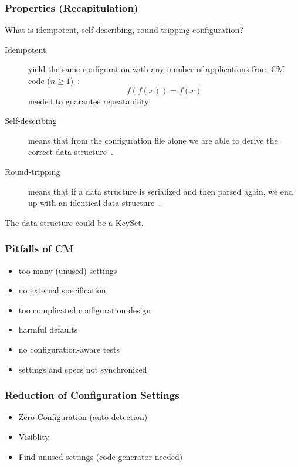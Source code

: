 

\begin{frame}
	\frametitle{Properties (Recapitulation)}

	\begin{task}
	What is idempotent, self-describing, round-tripping configuration?
	\end{task}

	\pause


	\begin{description}
	\item[Idempotent]
	yield the same configuration with any number of applications from CM code ($n\ge1$)~\cite{waldemar2013testing}:
	\[
		f(f(x))=f(x)
	\]
	needed to guarantee repeatability

	\item[Self-describing]
	means that from the configuration file alone we are able to derive the correct data structure~\cite{wadler2003xml}.

	\item[Round-tripping]
	means that if a data structure is serialized and then parsed again, we end up with an identical data structure~\cite{wadler2003xml}.
	\end{description}

	The data structure could be a KeySet.
\end{frame}

\begin{frame}
	\frametitle{Pitfalls of CM}

	\pause

	\begin{itemize}
	\item too many (unused) settings
	\item no external specification
	\item too complicated configuration design
	\item harmful defaults
	\item no configuration-aware tests
	\item settings and specs not synchronized
	\end{itemize}
\end{frame}

\begin{frame}
	\frametitle{Reduction of Configuration Settings}

	\pause

	\begin{itemize}
	\item Zero-Configuration (auto detection)
	\item Visiblity
	\item Find unused settings (code generator needed)
	\end{itemize}
\end{frame}


